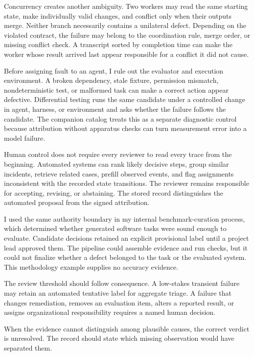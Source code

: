 Concurrency creates another ambiguity. Two workers may read the same starting state, make individually valid changes, and conflict only when their outputs merge. Neither branch necessarily contains a unilateral defect. Depending on the violated contract, the failure may belong to the coordination rule, merge order, or missing conflict check. A transcript sorted by completion time can make the worker whose result arrived last appear responsible for a conflict it did not cause.

Before assigning fault to an agent, I rule out the evaluator and execution environment. A broken dependency, stale fixture, permission mismatch, nondeterministic test, or malformed task can make a correct action appear defective. Differential testing runs the same candidate under a controlled change in agent, harness, or environment and asks whether the failure follows the candidate. The companion catalog treats this as a separate diagnostic control because attribution without apparatus checks can turn measurement error into a model failure.

Human control does not require every reviewer to read every trace from the beginning. Automated systems can rank likely decisive steps, group similar incidents, retrieve related cases, prefill observed events, and flag assignments inconsistent with the recorded state transitions. The reviewer remains responsible for accepting, revising, or abstaining. The stored record distinguishes the automated proposal from the signed attribution.

I used the same authority boundary in my internal benchmark-curation process, which determined whether generated software tasks were sound enough to evaluate. Candidate decisions retained an explicit provisional label until a project lead approved them. The pipeline could assemble evidence and run checks, but it could not finalize whether a defect belonged to the task or the evaluated system. This methodology example supplies no accuracy evidence.

The review threshold should follow consequence. A low-stakes transient failure may retain an automated tentative label for aggregate triage. A failure that changes remediation, removes an evaluation item, alters a reported result, or assigns organizational responsibility requires a named human decision.

When the evidence cannot distinguish among plausible causes, the correct verdict is unresolved. The record should state which missing observation would have separated them.

